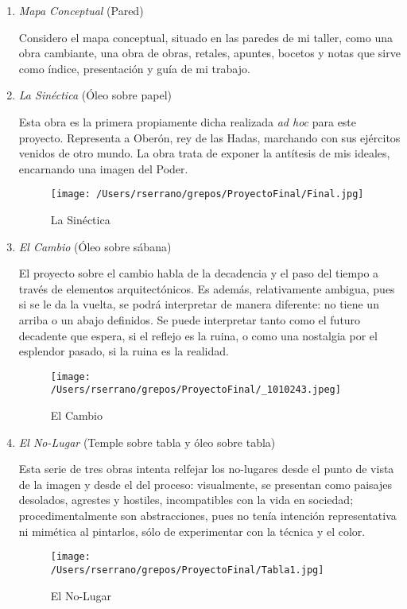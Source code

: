 \documentclass[twoside,twocolumn]{article}
\begin{document}
\begin{enumerate}
\def\labelenumi{\arabic{enumi}.}
\item
  \emph{Mapa Conceptual} (Pared)
  
  Considero el mapa conceptual, situado en las paredes de mi taller,
  como una obra cambiante, una obra de obras, retales, apuntes, bocetos
  y notas que sirve como índice, presentación y guía de mi trabajo.
  
\item
  \emph{La Sinéctica} (Óleo sobre papel)
  
  Esta obra es la primera propiamente dicha realizada \emph{ad hoc} para
  este proyecto. Representa a Oberón, rey de las Hadas, marchando con
  sus ejércitos venidos de otro mundo. La obra trata de exponer la
  antítesis de mis ideales, encarnando una imagen del
  Poder.
  \begin{figure*}
    \centering
    \texttt{[image: /Users/rserrano/grepos/ProyectoFinal/Final.jpg]}
    \caption{La Sinéctica}
  \end{figure*}

\item
  \emph{El Cambio} (Óleo sobre sábana)
   
  El proyecto sobre el cambio habla de la decadencia y el paso del
  tiempo a través de elementos arquitectónicos. Es además, relativamente
  ambigua, pues si se le da la vuelta, se podrá interpretar de manera
  diferente: no tiene un arriba o un abajo definidos. Se puede
  interpretar tanto como el futuro decadente que espera, si el reflejo
  es la ruina, o como una nostalgia por el esplendor pasado, si la ruina
  es la
  realidad.
  \begin{figure*}
    \centering
    \texttt{[image: /Users/rserrano/grepos/ProyectoFinal/\_1010243.jpeg]}
    \caption{El Cambio}
    \centering
  \end{figure*}

  
\item
  \emph{El No-Lugar} (Temple sobre tabla y óleo sobre tabla)
  
  Esta serie de tres obras intenta relfejar los no-lugares desde el
  punto de vista de la imagen y desde el del proceso: visualmente, se
  presentan como paisajes desolados, agrestes y hostiles, incompatibles
  con la vida en sociedad; procedimentalmente son abstracciones, pues no
  tenía intención representativa ni mimética al pintarlos, sólo de
  experimentar con la técnica y el
  color.
  \begin{figure*}
    \centering
    \texttt{[image: /Users/rserrano/grepos/ProyectoFinal/Tabla1.jpg]}
    \caption{El No-Lugar}
  \end{figure*}
  
\end{enumerate}
\end{document}
